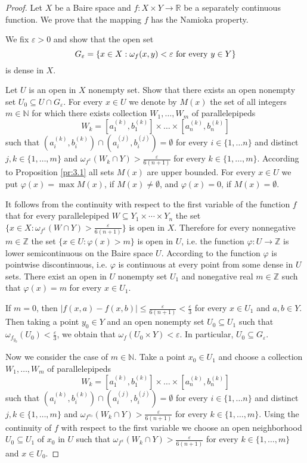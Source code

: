 \documentclass{amsart}
\begin{document}
\begin{proof} Let $X$ be a Baire space and $f:X\times Y\to\mathbb R$ be a separately continuous function. We prove that the mapping $f$ has the Namioka property.

We fix $\varepsilon>0$ and show that the open set $$G_{\varepsilon}=\{x\in X: \omega_f(x,y)< \varepsilon
\mbox{\,\,for\,\,every}\,\,y\in Y\}$$ is dense in $X$.

Let $U$ is an open in $X$ nonempty set. Show that there exists an open nonempty set $U_0\subseteq U\cap G_{\varepsilon}$. For every $x\in U$ we denote by $M(x)$ the set of all integers $m\in {\mathbb N}$ for which there exists collection $W_1,\dots, W_m$ of parallelepipeds $$W_k=[a_1^{(k)},b_1^{(k)}]\times\dots\times [a_n^{(k)},b_n^{(k)}]$$ such that $(a_i^{(k)},b_i^{(k)})\cap(a_i^{(j)},b_i^{(j)})=\emptyset$ for every $i\in\{1,\dots n\}$ and distinct $j,k\in \{1,\dots, m\}$ and $\omega_{f^x}(W_{k}\cap Y)> \frac{\varepsilon}{6(n+1)}$ for every $k\in \{1,\dots, m\}$. According to Proposition \ref{pr:3.1} all sets $M(x)$ are upper bounded. For every $x\in U$ we put $\varphi(x)=\max M(x)$, if $M(x)\ne\emptyset$, and $\varphi(x)=0$, if $M(x)=\emptyset$.

It follows from the continuity with respect to the first variable of the function $f$ that for every parallelepiped $W\subseteq Y_1\times\cdots \times Y_n$ the set $\{x\in X:\omega_{f^x}(W\cap Y)>\frac{\varepsilon}{6(n+1)}\}$ is open in $X$. Therefore for every nonnegative $m\in\mathbb Z$ the set $\{x\in U:\varphi(x)>m\}$ is open in $U$, i.e. the function $\varphi:U\to {\mathbb Z}$ is lower semicontinuous on the Baire space $U$. According to \cite{CT} the function $\varphi$ is pointwise discontinuous, i.e. $\varphi$ is continuous at every point from some dense in $U$ sets. There exist an open in $U$ nonempty set $U_1$ and nonegative real $m\in {\mathbb Z}$ such that $\varphi(x)=m$ for every $x\in U_1$.

If $m=0$, then $|f(x,a)-f(x,b)|\leq \frac{\varepsilon}{6(n+1)}<\frac{\varepsilon}{3}$ for every $x\in U_1$ and $a,b\in Y$. Then taking a point $y_0\in Y$ and an open nonempty set  $U_0\subseteq U_1$ such that $\omega_{f_{y_0}}(U_0)<\frac{\varepsilon}{3}$, we obtain that $\omega_f(U_0\times Y)< \varepsilon$. In particular, $U_0\subseteq G_\varepsilon$.

Now we consider the case of $m\in \mathbb N$. Take a point $x_0\in U_1$ and choose a collection $W_1,\dots, W_m$ of parallelepipeds $$W_k=[a_1^{(k)},b_1^{(k)}]\times\dots\times [a_n^{(k)},b_n^{(k)}]$$ such that $(a_i^{(k)},b_i^{(k)})\cap(a_i^{(j)},b_i^{(j)})=\emptyset$ for every  $i\in\{1,\dots n\}$ and distinct $j,k\in \{1,\dots, m\}$ and $\omega_{f^{x_0}}(W_{k}\cap Y)> \frac{\varepsilon}{6(n+1)}$ for every $k\in \{1,\dots, m\}$. Using the continuity of $f$ with respect to the first variable we choose an open neighborhood $U_0\subseteq U_1$ of $x_0$ in $U$ such that $\omega_{f^{x}}(W_{k}\cap Y)> \frac{\varepsilon}{6(n+1)}$ for every $k\in \{1,\dots, m\}$ and $x\in U_0$.


\end{proof}
\end{document}
